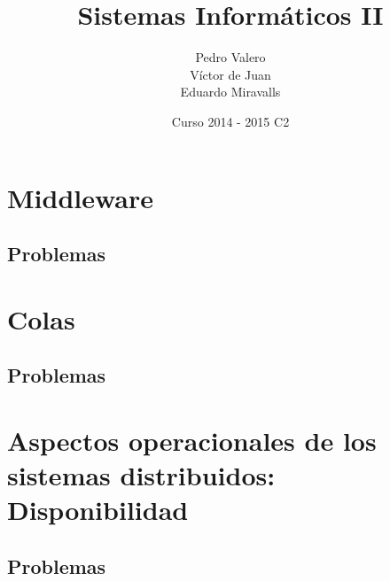 \documentclass{apuntes}
\title{Sistemas Informáticos II}
\author{Pedro Valero \\ Víctor de Juan \\ Eduardo Miravalls}
\date{Curso 2014 - 2015 C2}
\begin{document}
\newpage
\tableofcontents


\chapter{Middleware}

\newpage
\section{Problemas}



\chapter{Colas}

\section{Problemas}



\chapter{Aspectos operacionales de los sistemas distribuidos: Disponibilidad}

\newpage
\section{Problemas}


\printindex
\end{document}
